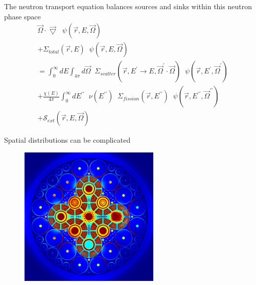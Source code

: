 \documentclass{beamer}
\begin{document}
    \begin{frame}{The neutron transport equation balances sources and sinks within this neutron phase space}
        \begin{equation*}
            \begin{split}
                \vec \Omega \cdot \vec \bigtriangledown \; \; \psi(\vec r, E, \vec \Omega) \\
                + \Sigma_{total}(\vec r, E) \; \; \psi(\vec r, E, \vec\Omega) \\
                = \int_0^\infty \! \! \! \! dE \int_{4\pi} \! \! \! \! d\vec\Omega \; \; \Sigma_{scatter}(\vec r, E^\prime \rightarrow E, \vec \Omega^\prime \cdot \vec \Omega) \; \; \psi(\vec r, E^\prime, \vec\Omega^\prime) \\
                + \frac{\chi(E)}{4\pi} \int_0^\infty \! \! \! \! dE^{\prime\prime} \; \; \nu (E^{\prime\prime}) \; \; \Sigma_{fission}(\vec r, E^{\prime\prime}) \; \; \psi(\vec r, E^{\prime\prime}, \vec\Omega^{\prime\prime}) \\
                + \mathcal{S}_{ext}(\vec r, E, \vec\Omega)
            \end{split}
        \end{equation*}
    \end{frame}

    \begin{frame}{Spatial distributions can be complicated}
        \begin{figure}
            \centering
            \includegraphics[width=18em]{./img/spaceFlux1.png}
            \caption*{}
        \end{figure}
    \end{frame}
\end{document}
